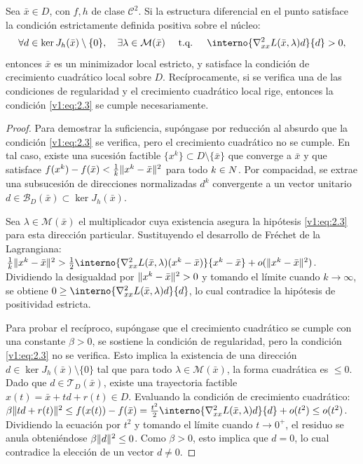 \begin{theorem}\label{v1:thm:2.3.2}
	Sea $\bar{x} \in D$, con $f, h$ de clase $\mathcal{C}^2$. Si la estructura diferencial en el punto satisface la condición estrictamente definida positiva sobre el núcleo:
 \begin{equation}
 \forall d \in \ker J_h(\bar{x}) \setminus \{0\}, \quad \exists \lambda \in \mathcal{M}(\bar{x}) \quad \tq \quad \interno{\nabla_{xx}^2 L(\bar{x}, \lambda) d}{d} > 0,
 \label{v1:eq:2.3}
 \end{equation}
 entonces $\bar{x}$ es un minimizador local estricto, y satisface la condición de crecimiento cuadrático local sobre $D$. Recíprocamente, si se verifica una de las condiciones de regularidad y el crecimiento cuadrático local rige, entonces la condición \eqref{v1:eq:2.3} se cumple necesariamente.
 \end{theorem}

\begin{proof}
	Para demostrar la suficiencia, supóngase por reducción al absurdo que la condición \eqref{v1:eq:2.3} se verifica, pero el crecimiento cuadrático no se cumple. En tal caso, existe una sucesión factible $\{x^k\} \subset D \setminus \{\bar{x}\}$ que converge a $\bar{x}$ y que satisface $f(x^k) - f(\bar{x}) < \frac{1}{k} \lVert x^k - \bar{x}\rVert^2$ para todo $k \in N$. Por compacidad, se extrae una subsucesión de direcciones normalizadas $d^k$ convergente a un vector unitario $d \in \mathcal{B}_D(\bar{x}) \subset \ker J_h(\bar{x})$.

	Sea $\lambda \in \mathcal{M}(\bar{x})$ el multiplicador cuya existencia asegura la hipótesis \eqref{v1:eq:2.3} para esta dirección particular. Sustituyendo el desarrollo de Fréchet de la Lagrangiana: $\frac{1}{k} \norm{x^k - \bar{x}}^2 > \frac{1}{2} \interno{\nabla_{xx}^2 L(\bar{x}, \lambda)(x^k - \bar{x})}{x^k - \bar{x}} + o(\norm{x^k - \bar{x}}^2)$. Dividiendo la desigualdad por $\lVert x^k - \bar{x}\rVert^2 > 0$ y tomando el límite cuando $k \to \infty$, se obtiene $0 \ge \interno{\nabla_{xx}^2 L(\bar{x}, \lambda)d}{d}$, lo cual contradice la hipótesis de positividad estricta.
 
 Para probar el recíproco, supóngase que el crecimiento cuadrático se cumple con una constante $\beta > 0$, se sostiene la condición de regularidad, pero la condición \eqref{v1:eq:2.3} no se verifica. Esto implica la existencia de una dirección $d \in \ker J_h(\bar{x}) \setminus \{0\}$ tal que para todo $\lambda \in \mathcal{M}(\bar{x})$, la forma cuadrática es $\le 0$. Dado que $d \in \mathcal{T}_D(\bar{x})$, existe una trayectoria factible $x(t) = \bar{x} + td + r(t) \in D$. Evaluando la condición de crecimiento cuadrático: $\beta \norm{td + r(t)}^2 \le f(x(t)) - f(\bar{x}) = \frac{t^2}{2} \interno{\nabla_{xx}^2 L(\bar{x}, \lambda)d}{d} + o(t^2) \le o(t^2)$. Dividiendo la ecuación por $t^2$ y tomando el límite cuando $t \to 0^+$, el residuo se anula obteniéndose $\beta \lVert d\rVert^2 \le 0$. Como $\beta > 0$, esto implica que $d=0$, lo cual contradice la elección de un vector $d \neq 0$.
\end{proof}


